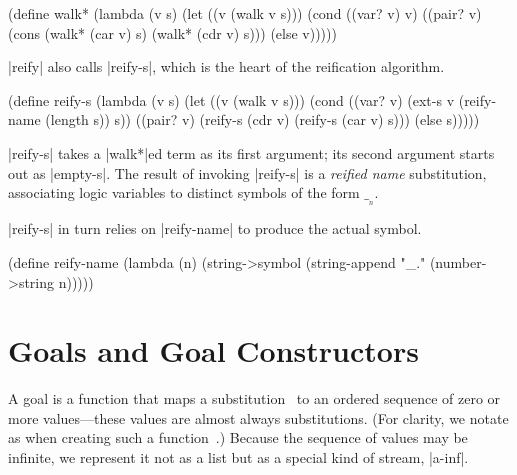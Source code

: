 \schemedisplayspace
\begin{schemedisplay}
(define walk*
  (lambda (v s)
    (let ((v (walk v s)))
      (cond
        ((var? v) v)
        ((pair? v) (cons (walk* (car v) s) (walk* (cdr v) s)))
        (else v)))))
\end{schemedisplay}

\scheme|reify| also calls \scheme|reify-s|, which is the heart of the
reification algorithm. 

\schemedisplayspace
\begin{schemedisplay}
(define reify-s
  (lambda (v s)
    (let ((v (walk v s)))
      (cond
        ((var? v) (ext-s v (reify-name (length s)) s))
        ((pair? v) (reify-s (cdr v) (reify-s (car v) s)))
        (else s)))))
\end{schemedisplay}

\noindent \mbox{\scheme|reify-s|} takes a \scheme|walk*|ed term
as its first argument; its second argument starts out as
\scheme|empty-s|.  The result of invoking \scheme|reify-s| is a
\emph{reified name} substitution, associating logic variables to
distinct symbols of the form $\__{_{n}}$.

\scheme|reify-s| in turn relies on \scheme|reify-name| to produce the actual symbol.

\schemedisplayspace
\begin{schemedisplay}
(define reify-name
  (lambda (n)
    (string->symbol (string-append "_." (number->string n)))))
\end{schemedisplay}

\section{Goals and Goal Constructors}\label{goalconstructors}

A goal  is a function that maps a substitution~ to
an ordered sequence of zero or more values---these values are almost
always substitutions.  (For clarity, we notate  as
 when creating such a function~.)  Because
the sequence of values may be infinite, we represent it not as a list
but as a special kind of stream, \mbox{\scheme|a-inf|}.

